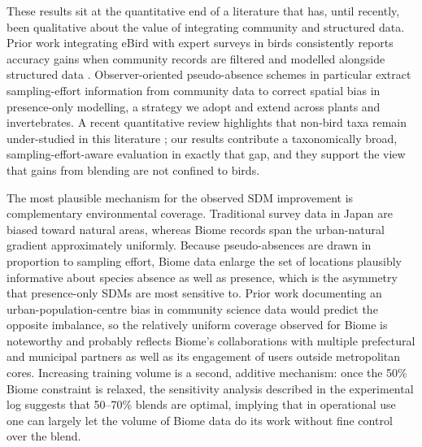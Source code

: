 \documentclass[11pt]{article}
\begin{document}
These results sit at the quantitative end of a literature that has, until recently, been qualitative about the value of integrating community and structured data. Prior work integrating eBird with expert surveys in birds consistently reports accuracy gains when community records are filtered and modelled alongside structured data \citep{johnston2018estimates,johnston2021analytical,robinson2020integrating,steen2019stringent}. Observer-oriented pseudo-absence schemes in particular \citep{milanesi2020observer} extract sampling-effort information from community data to correct spatial bias in presence-only modelling, a strategy we adopt and extend across plants and invertebrates. A recent quantitative review highlights that non-bird taxa remain under-studied in this literature \citep{feldman2021trends}; our results contribute a taxonomically broad, sampling-effort-aware evaluation in exactly that gap, and they support the view that gains from blending are not confined to birds.

The most plausible mechanism for the observed SDM improvement is complementary environmental coverage. Traditional survey data in Japan are biased toward natural areas, whereas Biome records span the urban-natural gradient approximately uniformly. Because pseudo-absences are drawn in proportion to sampling effort, Biome data enlarge the set of locations plausibly informative about species absence as well as presence, which is the asymmetry that presence-only SDMs are most sensitive to. Prior work documenting an urban-population-centre bias in community science data \citep{kendal2020citybias} would predict the opposite imbalance, so the relatively uniform coverage observed for Biome is noteworthy and probably reflects Biome's collaborations with multiple prefectural and municipal partners as well as its engagement of users outside metropolitan cores. Increasing training volume is a second, additive mechanism: once the 50\% Biome constraint is relaxed, the sensitivity analysis described in the experimental log suggests that 50--70\% blends are optimal, implying that in operational use one can largely let the volume of Biome data do its work without fine control over the blend.
\end{document}
